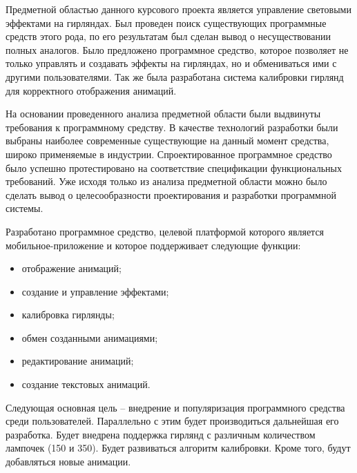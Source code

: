 Предметной областью данного курсового проекта является управление световыми эффектами на гирляндах. Был проведен поиск существующих программные средств этого рода, по его результатам был сделан вывод о несуществовании полных аналогов. Было предложено программное средство, которое позволяет не только управлять и создавать эффекты на гирляндах, но и обмениваться ими с другими пользователями. Так же была разработана система калибровки гирлянд для корректного отображения анимаций. 

На основании проведенного анализа предметной области были выдвинуты требования к программному средству. В качестве технологий разработки были выбраны наиболее современные существующие на данный момент средства, широко применяемые в индустрии. Спроектированное программное средство было успешно протестировано на соответствие спецификации функциональных требований. Уже исходя только из анализа предметной области можно было сделать вывод о целесообразности проектирования и разработки программной системы.

Разработано программное средство, целевой платформой которого является мобильное-приложение и которое поддерживает следующие функции:
\begin{itemize}
	\item отображение анимаций;
	\item создание и управление эффектами;
	\item калибровка гирлянды;
	\item обмен созданными анимациями;
	\item редактирование анимаций;
	\item создание текстовых анимаций.
\end{itemize}

Следующая основная цель -- внедрение и популяризация программного средства среди пользователей. Параллельно с этим будет производиться дальнейшая его разработка. Будет внедрена поддержка гирлянд с различным количеством лампочек (150 и 350). Будет развиваться алгоритм калибровки. Кроме того, будут добавляться новые анимации.
